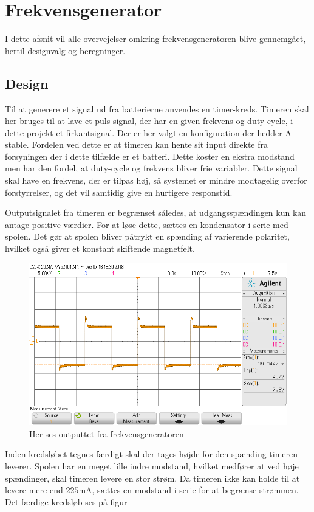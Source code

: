 \section{Frekvensgenerator}\label{sec:frekv_gen}
I dette afsnit vil alle overvejelser omkring frekvensgeneratoren blive gennemgået, hertil designvalg og beregninger. 
\subsection{Design}
Til at generere et signal ud fra batterierne anvendes en timer-kreds. 
Timeren skal her bruges til at lave et puls-signal, der har en given frekvens og duty-cycle, i dette projekt et firkantsignal. 
Der er her valgt en konfiguration der hedder A-stable. 
Fordelen ved dette er at timeren kan hente sit input direkte fra forsyningen der i dette tilfælde er et batteri. Dette koster en ekstra modstand men har den fordel, at duty-cycle og frekvens bliver frie variabler. 
Dette signal skal have en frekvens, der er tilpas høj, så systemet er mindre modtagelig overfor forstyrrelser, og det vil samtidig give en hurtigere responstid. 

Outputsignalet fra timeren er begrænset således, at udgangsspændingen kun kan antage positive værdier.
For at løse dette, sættes en kondensator i serie med spolen.
Det gør at spolen bliver påtrykt en spænding af varierende polaritet, hvilket også giver et konstant skiftende magnetfelt.
\begin{figure}[h!]
	\centering
	\includegraphics[width=1\textwidth]{billeder/freq_png.png}
	\caption{Her ses outputtet fra frekvensgeneratoren}
	\label{fig:frekvensgenerator}
\end{figure}
Inden kredsløbet tegnes færdigt skal der tages højde for den spænding timeren leverer. 
Spolen har en meget lille indre modstand, hvilket medfører at ved høje spændinger, skal timeren levere en stor strøm. 
Da timeren ikke kan holde til at levere mere end $225 \si{\milli\ampere}$, sættes en modstand i serie for at begrænse strømmen. 
Det færdige kredsløb ses på figur 

